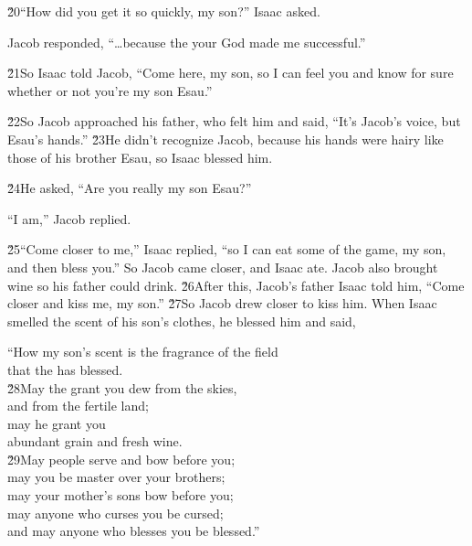 \v{20}``How did you get it so quickly, my son?'' Isaac asked.

Jacob responded, ``{\ldots}because the  your God made me successful.''

\v{21}So Isaac told Jacob, ``Come here, my son, so I can feel you and know for sure whether or not you're my son Esau.''

\v{22}So Jacob approached his father, who felt him and said, ``It's Jacob's voice, but Esau's hands.'' \v{23}He didn't recognize Jacob, because his hands were hairy like those of his brother Esau, so Isaac blessed him.

\v{24}He asked, ``Are you really my son Esau?''

``I am,'' Jacob replied.

\v{25}``Come closer to me,'' Isaac replied, ``so I can eat some of the game, my son, and then bless you.'' So Jacob came closer, and Isaac ate. Jacob also brought wine so his father could drink. \v{26}After this, Jacob's father Isaac told him, ``Come closer and kiss me, my son.'' \v{27}So Jacob drew closer to kiss him. When Isaac smelled the scent of his son's clothes, he blessed him and said,

\begin{poetry}
\poeml ``How my son's scent is the fragrance of the field \\
\poemll    that the  has blessed. \\
\poeml \v{28}May the  grant you dew from the skies, \\
\poemll    and from the fertile land; \\
\poeml may he grant you \\
\poemll    abundant grain and fresh wine. \\
\poeml \v{29}May people serve and bow before you; \\
\poemll    may you be master over your brothers; \\
\poeml may your mother's sons bow before you; \\
\poemll    may anyone who curses you be cursed; \\
\poemlll       and may anyone who blesses you be blessed.''
\end{poetry}


